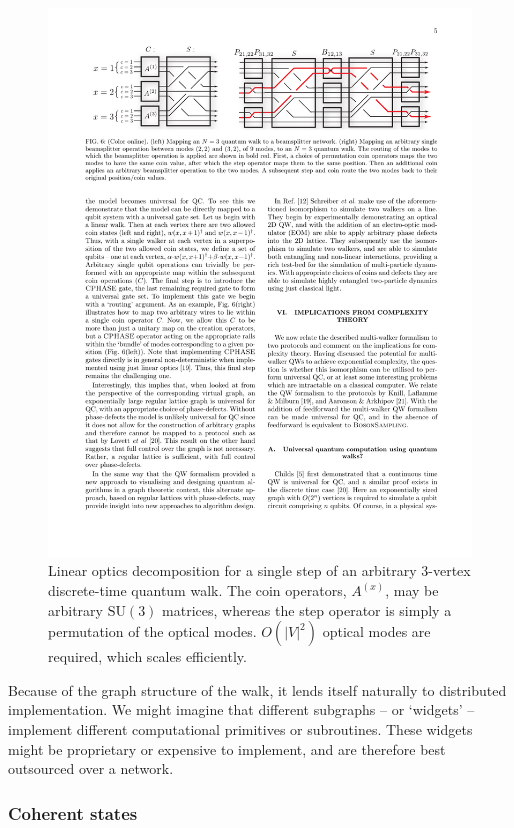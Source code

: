 \documentclass[aps, rmp, twocolumn, amsmath, amssymb, nofootinbib, superscriptaddress, longbibliography, floatfix, table-of-contents, eqsecnum]{revtex4-1}
\begin{document}
\begin{figure}[!htb]
\includegraphics[width=\columnwidth]{QW_LO_representation}
\caption{Linear optics decomposition for a single step of an arbitrary 3-vertex discrete-time quantum walk. The coin operators, $A^{(x)}$, may be arbitrary $\text{SU}(3)$ matrices, whereas the step operator is simply a permutation of the optical modes. $O(|V|^2)$ optical modes are required, which scales efficiently.} \label{fig:QW_LO_representation}
\end{figure}

Because of the graph structure of the walk, it lends itself naturally to distributed implementation. We might imagine that different subgraphs -- or `widgets' \cite{bib:Lovett10, bib:Childs09} -- implement different computational primitives or subroutines. These widgets might be proprietary or expensive to implement, and are therefore best outsourced over a network.

%
%

\subsubsection{Coherent states} \label{sec:coherent_state_QC} 
\end{document}
